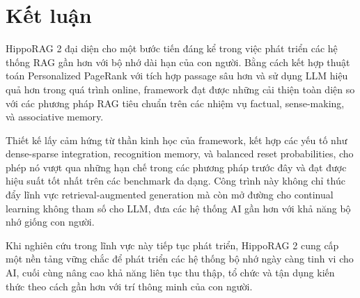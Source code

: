 \documentclass[../main.tex]{subfiles}
\begin{document}
\section{Kết luận}
HippoRAG 2 đại diện cho một bước tiến đáng kể trong việc phát triển các hệ thống RAG gần hơn với bộ nhớ dài hạn của con người. Bằng cách kết hợp thuật toán Personalized PageRank với tích hợp passage sâu hơn và sử dụng LLM hiệu quả hơn trong quá trình online, framework đạt được những cải thiện toàn diện so với các phương pháp RAG tiêu chuẩn trên các nhiệm vụ factual, sense-making, và associative memory.

Thiết kế lấy cảm hứng từ thần kinh học của framework, kết hợp các yếu tố như dense-sparse integration, recognition memory, và balanced reset probabilities, cho phép nó vượt qua những hạn chế trong các phương pháp trước đây và đạt được hiệu suất tốt nhất trên các benchmark đa dạng. Công trình này không chỉ thúc đẩy lĩnh vực retrieval-augmented generation mà còn mở đường cho continual learning không tham số cho LLM, đưa các hệ thống AI gần hơn với khả năng bộ nhớ giống con người.

Khi nghiên cứu trong lĩnh vực này tiếp tục phát triển, HippoRAG 2 cung cấp một nền tảng vững chắc để phát triển các hệ thống bộ nhớ ngày càng tinh vi cho AI, cuối cùng nâng cao khả năng liên tục thu thập, tổ chức và tận dụng kiến thức theo cách gần hơn với trí thông minh của con người.
\end{document}
